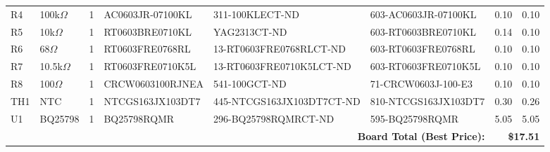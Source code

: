 {\begin{longtable}{@{}llrlp{2.8cm}p{2.5cm}rr@{}}
R4 & 100k$\Omega$ & 1 & AC0603JR-07100KL & 311-100KLECT-ND & 603-AC0603JR-07100KL & 0.10 & 0.10 \\
R5 & 10k$\Omega$ & 1 & RT0603BRE0710KL & YAG2313CT-ND & 603-RT0603BRE0710KL & 0.14 & 0.10 \\
R6 & 68$\Omega$ & 1 & RT0603FRE0768RL & 13-RT0603FRE0768RLCT-ND & 603-RT0603FRE0768RL & 0.10 & 0.10 \\
R7 & 10.5k$\Omega$ & 1 & RT0603FRE0710K5L & 13-RT0603FRE0710K5LCT-ND & 603-RT0603FRE0710K5L & 0.10 & 0.10 \\
R8 & 100$\Omega$ & 1 & CRCW0603100RJNEA & 541-100GCT-ND & 71-CRCW0603J-100-E3 & 0.10 & 0.10 \\
TH1 & NTC & 1 & NTCGS163JX103DT7 & 445-NTCGS163JX103DT7CT-ND & 810-NTCGS163JX103DT7 & 0.30 & 0.26 \\
U1 & BQ25798 & 1 & BQ25798RQMR & 296-BQ25798RQMRCT-ND & 595-BQ25798RQMR & 5.05 & 5.05 \\
\midrule
\multicolumn{6}{r}{\textbf{Board Total (Best Price):}} & \multicolumn{2}{r}{\textbf{\$17.51}} \\
\end{longtable}

}
